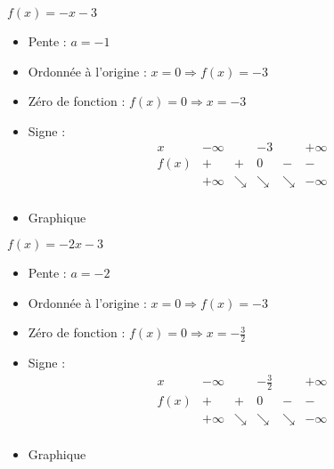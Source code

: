 \begin{solution}
$f(x)=-x-3$
\begin{itemize}
\item Pente :	$a=-1$
\item Ordonnée à l’origine :	$x=0\Rightarrow f(x)=-3$
\item Zéro de fonction :	$f(x)=0\Rightarrow x=-3$
\item Signe :	
$$\begin{array}{l|l|l|l|l|l}
x    & -\infty &   & -3 &   & +\infty \\
\hline
f(x) & +       & + & 0  & - & -   \\
 & +\infty & \searrow & \searrow & \searrow & -\infty \\   
\end{array}$$
\item Graphique
\end{itemize}
\end{solution}

\begin{solution}
$f(x)=-2x-3$
\begin{itemize}
\item Pente :	$a=-2$
\item Ordonnée à l’origine :	$x=0\Rightarrow f(x)=-3$
\item Zéro de fonction :	$f(x)=0\Rightarrow x=-\frac{3}{2}$
\item Signe :	
$$\begin{array}{l|l|l|l|l|l}
x    & -\infty &   & -\frac{3}{2} &   & +\infty \\
\hline
f(x) & +       & + & 0  & - & -   \\
 & +\infty & \searrow & \searrow & \searrow & -\infty \\   
\end{array}$$
\item Graphique
\end{itemize}
\end{solution}

